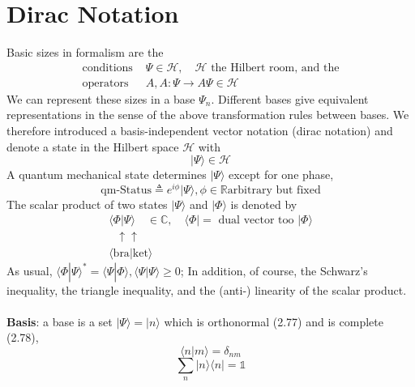 \section{Dirac Notation}
Basic sizes in formalism are the
\begin{equation}
\begin{array}{ll}{\text { conditions }} & {\Psi \in \mathcal{H}, \quad \mathcal{H} \text { the Hilbert room, and the }} \\ {\text { operators }} & {A, A: \Psi \rightarrow A \Psi \in \mathcal{H}}\end{array}
\end{equation}
We can represent these sizes in a base {$\Psi_n$}. Different bases give equivalent representations in the sense of the above transformation rules between bases. We therefore introduced a basis-independent vector notation (dirac notation) and denote a state in the Hilbert space $\mathcal{H}$ with
\begin{equation}
    | \Psi \rangle\in \mathcal{H}
\end{equation}
A quantum mechanical state determines $|\Psi\rangle$ except for one phase,
\begin{equation}
    \text{qm-Status}\triangleq e^{i\phi}|\Psi\rangle,\phi\in\mathbb{R} \text{arbitrary but fixed}
\end{equation}
The scalar product of two states $|\Psi\rangle$ and $|\Phi\rangle$ is denoted by
\begin{equation}
\begin{array}{l}{\langle\Phi | \Psi\rangle \quad \in \mathbb{C}, \quad\langle\Phi|=\text { dual vector too }|\Phi\rangle} \\ {\text{ }\uparrow \text{}\uparrow} \\ {\langle\text {bra}| \text {ket}\rangle}\end{array}
\end{equation}
As usual, $\langle\Phi|\Psi\rangle^*=\langle\Psi|\Phi\rangle,\langle\Psi|\Psi\rangle\geq 0$; In addition, of course, the Schwarz's inequality, the triangle inequality, and the (anti-) linearity of the scalar product.\\\\
\textbf{Basis}: a base is a set {$|\Psi\rangle=| n\rangle$} which is orthonormal (2.77) and is complete (2.78),
\begin{equation}
    \langle n| m\rangle = \delta_{nm}
\end{equation}
\begin{equation}
    \sum_n| n\rangle\langle n| = \mathbb{1}
\end{equation}
